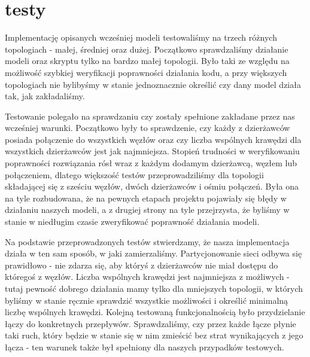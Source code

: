 \section{testy}
Implementację opisanych wcześniej modeli testowaliśmy na trzech różnych topologiach - małej, średniej oraz
dużej. Początkowo sprawdzaliśmy działanie modeli oraz skryptu tylko na bardzo małej topologii. Było taki
ze względu na możliwość szybkiej weryfikacji poprawności działania kodu, a przy większych
topologiach nie bylibyśmy w stanie jednoznacznie określić czy dany model działa tak, jak zakładaliśmy.

Testowanie polegało na sprawdzaniu czy zostały spełnione zakładane przez nas wcześniej warunki. Początkowo
były to sprawdzenie, czy każdy z dzierżawców posiada połączenie do wszystkich węzłów oraz czy liczba 
wspólnych krawędzi dla wszystkich dzierżawców jest jak najmniejsza. Stopień trudności w weryfikowaniu 
poprawności rozwiązania rósł wraz z każdym dodamym dzierżawcą, węzłem lub połączeniem, dlatego większość 
testów przeprowadziliśmy dla topologii składającej się z sześciu węzłów, dwóch dzierżawców i ośmiu połączeń. 
Była ona na tyle rozbudowana, że na pewnych etapach projektu pojawiały się błędy w działaniu naszych modeli, 
a z drugiej strony na tyle przejrzysta, że byliśmy w stanie w niedługim czasie zweryfikować poprawność działania 
modeli.

Na podstawie przeprowadzonych testów stwierdzamy, że nasza implementacja działa w ten sam sposób,
w jaki zamierzaliśmy. Partycjonowanie sieci odbywa się prawidłowo - nie zdarza się, aby któryś z dzierżawców
nie miał dostępu do któregoś z węzłów. Liczba wspólnych krawędzi jest najmniejsza z możliwych - tutaj pewność 
dobrego działania mamy tylko dla mniejszych topologii, w których byliśmy w stanie ręcznie sprawdzić wszystkie 
możliwości i określić minimalną liczbę wspólnych krawędzi. Kolejną testowaną funkcjonalnością było 
przydzielanie łączy do konkretnych przepływów. Sprawdzaliśmy, czy przez każde łącze płynie taki ruch, który 
będzie w stanie się w nim zmieścić bez strat wynikających z jego łącza - 
ten warunek także był spełniony dla naszych przypadków testowych.

